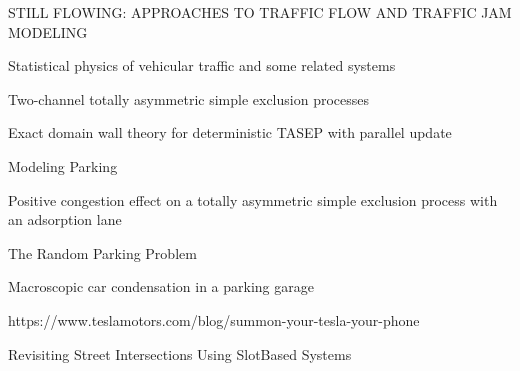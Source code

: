 \documentclass[]{article}
\begin{document}
\begin{thebibliography}{9}
STILL FLOWING: APPROACHES TO TRAFFIC FLOW AND
TRAFFIC JAM MODELING

Statistical physics of vehicular traffic and some related systems

Two-channel totally asymmetric simple exclusion
processes

Exact domain wall theory for deterministic TASEP with parallel update

Modeling Parking 

Positive congestion effect on a totally asymmetric simple exclusion process with an adsorption lane

The Random Parking Problem 

Macroscopic car condensation in a parking garage

https://www.teslamotors.com/blog/summon-your-tesla-your-phone

Revisiting Street Intersections Using SlotBased
Systems
	
\end{thebibliography}
\end{document}
